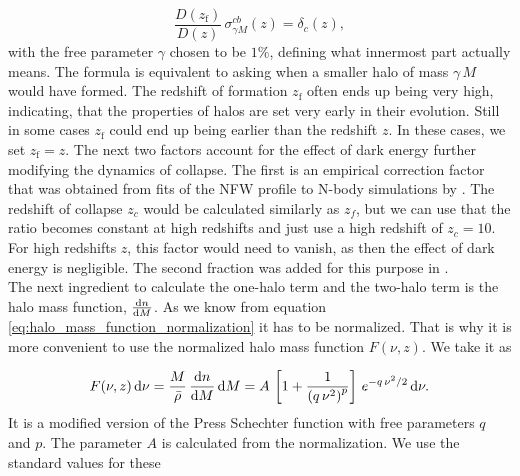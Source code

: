 \documentclass[../main.tex]{subfiles}
\begin{document}
\begin{equation}
    \frac{D(z_\mathrm{f})}{D(z)}\,\sigma^{cb}_{\gamma M }(z) = \delta_c(z),
\end{equation}
with the free parameter $\gamma$ chosen to be $1\%$, defining what innermost part actually means. The formula is equivalent to asking when a smaller halo of mass $\gamma\,M$ would have formed. The redshift of formation $z_\mathrm{f}$ often ends up being very high, indicating, that the properties of halos are set very early in their evolution. Still in some cases $z_\mathrm{f}$ could end up being earlier than the redshift $z$. In these cases, we set $z_\mathrm{f}=z$. The next two factors account for the effect of dark energy further modifying the dynamics of collapse. The first is an empirical correction factor that was obtained from fits of the NFW profile to N-body simulations by \cite{2004A&A...416..853D}. The redshift of collapse $z_c$ would be calculated similarly as $z_f$, but we can use that the ratio becomes constant at high redshifts and just use a high redshift of $z_c=10$. For high redshifts $z$, this factor would need to vanish, as then the effect of dark energy is negligible. The second fraction was added for this purpose in \hmcode.\\
The next ingredient to calculate the one-halo term and the two-halo term is the halo mass function, $\frac{\mathrm{d} n}{\mathrm{d} M}$. As we know from equation \ref{eq:halo_mass_function_normalization} it has to be normalized.  That is why it is more convenient to use the normalized halo mass function $F(\nu,z)$. We take it as

\begin{equation}
    F(\nu,z) \,\mathrm{d} \nu= \frac{M}{\bar{\rho}}\, \frac{\mathrm{d} n}{\mathrm{d} M} \, \mathrm{d} M = A\,\left[1+\frac{1}{\left(q\,\nu^2\right)^p}\right]\,e^{-q\,\nu^2/2} \,\mathrm{d} \nu.
\end{equation}
It is a modified version of the Press Schechter function with free parameters $q$ and $p$. The parameter $A$ is calculated from the normalization. We use the standard values for these 
\end{document}
